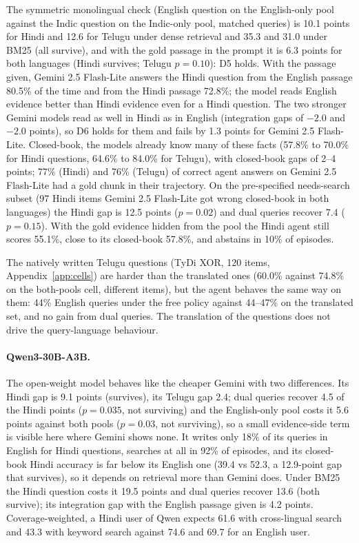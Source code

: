 The symmetric monolingual check (English question on the English-only pool against the Indic question on the Indic-only pool, matched queries) is 10.1 points for Hindi and 12.6 for Telugu under dense retrieval and 35.3 and 31.0 under BM25 (all survive), and with the gold passage in the prompt it is 6.3 points for both languages (Hindi survives; Telugu $p=0.10$): D5 holds. With the passage given, Gemini 2.5 Flash-Lite answers the Hindi question from the English passage 80.5\% of the time and from the Hindi passage 72.8\%; the model reads English evidence better than Hindi evidence even for a Hindi question. The two stronger Gemini models read as well in Hindi as in English (integration gaps of $-2.0$ and $-2.0$ points), so D6 holds for them and fails by 1.3 points for Gemini 2.5 Flash-Lite. Closed-book, the models already know many of these facts (57.8\% to 70.0\% for Hindi questions, 64.6\% to 84.0\% for Telugu), with closed-book gaps of 2--4 points; 77\% (Hindi) and 76\% (Telugu) of correct agent answers on Gemini 2.5 Flash-Lite had a gold chunk in their trajectory. On the pre-specified needs-search subset (97 Hindi items Gemini 2.5 Flash-Lite got wrong closed-book in both languages) the Hindi gap is 12.5 points ($p=0.02$) and dual queries recover 7.4 ($p=0.15$). With the gold evidence hidden from the pool the Hindi agent still scores 55.1\%, close to its closed-book 57.8\%, and abstains in 10\% of episodes.

The natively written Telugu questions (TyDi XOR, 120 items, Appendix~\ref{app:cells}) are harder than the translated ones (60.0\% against 74.8\% on the both-pools cell, different items), but the agent behaves the same way on them: 44\% English queries under the free policy against 44--47\% on the translated set, and no gain from dual queries. The translation of the questions does not drive the query-language behaviour.

\paragraph{Qwen3-30B-A3B.} The open-weight model behaves like the cheaper Gemini with two differences. Its Hindi gap is 9.1 points (survives), its Telugu gap 2.4; dual queries recover 4.5 of the Hindi points ($p=0.035$, not surviving) and the English-only pool costs it 5.6 points against both pools ($p=0.03$, not surviving), so a small evidence-side term is visible here where Gemini shows none. It writes only 18\% of its queries in English for Hindi questions, searches at all in 92\% of episodes, and its closed-book Hindi accuracy is far below its English one (39.4 vs 52.3, a 12.9-point gap that survives), so it depends on retrieval more than Gemini does. Under BM25 the Hindi question costs it 19.5 points and dual queries recover 13.6 (both survive); its integration gap with the English passage given is 4.2 points. Coverage-weighted, a Hindi user of Qwen expects 61.6 with cross-lingual search and 43.3 with keyword search against 74.6 and 69.7 for an English user.

